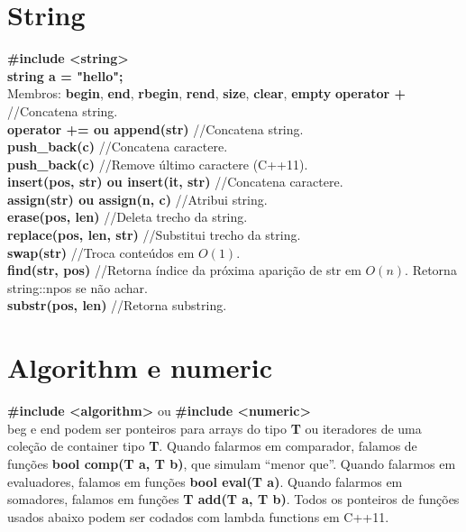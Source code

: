 \begin{multicols}{2}
\section{String}

\textbf{\#include <string>}\\
\textbf{string a = "hello";}\\

Membros: \textbf{begin}, \textbf{end}, \textbf{rbegin}, \textbf{rend}, \textbf{size}, \textbf{clear}, \textbf{empty}
\textbf{operator +} //Concatena string.\\
\textbf{operator += ou append(str)} //Concatena string.\\
\textbf{push\_back(c)} //Concatena caractere.\\
\textbf{push\_back(c)} //Remove último caractere (C++11).\\
\textbf{insert(pos, str) ou insert(it, str)} //Concatena caractere.\\
\textbf{assign(str) ou assign(n, c)} //Atribui string.\\
\textbf{erase(pos, len)} //Deleta trecho da string.\\
\textbf{replace(pos, len, str)} //Substitui trecho da string.\\
\textbf{swap(str)} //Troca conteúdos em $O(1)$.\\
\textbf{find(str, pos)} //Retorna índice da próxima aparição de str em $O(n)$. Retorna string::npos se não achar.\\
\textbf{substr(pos, len)} //Retorna substring.\\

\section{Algorithm e numeric}

\textbf{\#include <algorithm>} ou \textbf{\#include <numeric>}\\
beg e end podem ser ponteiros para arrays do tipo \textbf{T} ou iteradores de uma coleção de container tipo \textbf{T}. Quando falarmos em comparador, falamos de funções \textbf{bool comp(T a, T b)}, que simulam ``menor que''. Quando falarmos em evaluadores, falamos em funções \textbf{bool eval(T a)}. Quando falarmos em somadores, falamos em funções \textbf{T add(T a, T b)}. Todos os ponteiros de funções usados abaixo podem ser codados com lambda functions em C++11.\\


\end{multicols}
